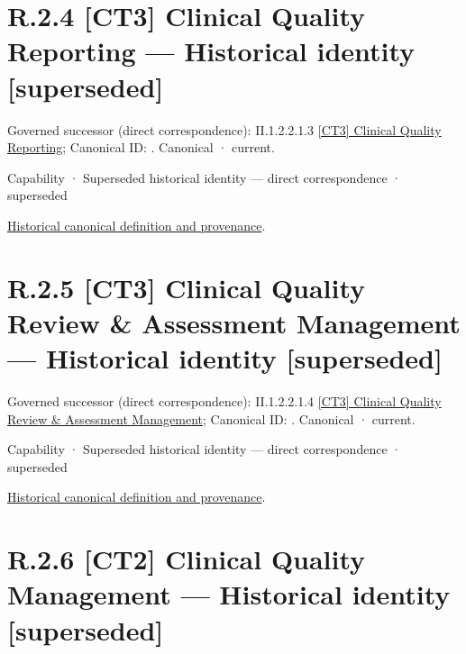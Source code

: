 \section*{R.2.4 [CT3] Clinical Quality Reporting — Historical identity [superseded]}
\label{navigation:R.2.4}

{\small Governed successor (direct correspondence): II.1.2.2.1.3 \hyperref[element:70f34839c23042d59469e6ef96944057]{[CT3] Clinical Quality Reporting}; Canonical ID: \texttt{}. Canonical · current.}\par
\label{element:e5812fcdf3f5465b9b1d8ba536075c5f}
{\small Capability · Superseded historical identity — direct correspondence · superseded}\par
\href{../../../../../../../continuum/strategy/capability/e5812fcdf3f5465b9b1d8ba536075c5f.md}{Historical canonical definition and provenance}.\par
\section*{R.2.5 [CT3] Clinical Quality Review \& Assessment Management — Historical identity [superseded]}
\label{navigation:R.2.5}

{\small Governed successor (direct correspondence): II.1.2.2.1.4 \hyperref[element:8318c35b302b4dcaa0e795fbfdc93e3b]{[CT3] Clinical Quality Review \& Assessment Management}; Canonical ID: \texttt{}. Canonical · current.}\par
\label{element:4b17ec92f0af4c4b9556912dbdd0f29f}
{\small Capability · Superseded historical identity — direct correspondence · superseded}\par
\href{../../../../../../../continuum/strategy/capability/4b17ec92f0af4c4b9556912dbdd0f29f.md}{Historical canonical definition and provenance}.\par
\section*{R.2.6 [CT2] Clinical Quality Management — Historical identity [superseded]}
\label{navigation:R.2.6}


